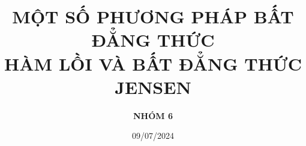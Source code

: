 \documentclass[aspectratio=169]{beamer}
\title{
MỘT SỐ PHƯƠNG PHÁP BẤT ĐẲNG THỨC\\ HÀM LỒI VÀ BẤT ĐẲNG THỨC JENSEN}
\author{\textbf{ NHÓM 6}}
\date{09/07/2024}
\begin{document}
\titlepage


% 
% 
% 
% 
% 
% 
% 
% 
% 
% 
\begin{frame}
\end{frame}
\begin{frame}
\end{frame}
\begin{frame}
\end{frame}
\begin{frame}
\end{frame}
\begin{frame}
\end{frame}
\begin{frame}
\end{frame}
\begin{frame}
\end{frame}
\begin{frame}
\end{frame}
\begin{frame}
\end{frame}
\begin{frame}
\end{frame}
\begin{frame}
\end{frame}
\begin{frame}
\end{frame}
\begin{frame}
\end{frame}
\begin{frame}
\end{frame}
\begin{frame}
\end{frame}
\begin{frame}
\end{frame}
\begin{frame}
\end{frame}
\begin{frame}
\end{frame}
\begin{frame}
\end{frame}
\begin{frame}
\end{frame}
\end{document}
